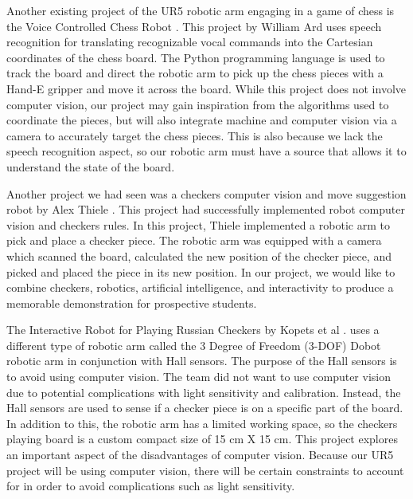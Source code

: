 Another existing project of the UR5 robotic arm engaging in a game of chess is the Voice Controlled Chess Robot \cite{Ard2020}. This project by William Ard uses speech recognition for translating recognizable vocal commands into the Cartesian coordinates of the chess board. The Python programming language is used to track the board and direct the robotic arm to pick up the chess pieces with a Hand-E gripper and move it across the board. While this project does not involve computer vision, our project may gain inspiration from the algorithms used to coordinate the pieces, but will also integrate machine and computer vision via a camera to  accurately target the chess pieces. This is also because we lack the speech recognition aspect, so our robotic arm must have a source that allows it to understand the state of the board.  

Another project we had seen was a checkers computer vision and move suggestion robot by Alex Thiele \cite{Thiele2015}. This project had successfully implemented robot computer vision and checkers rules. In this project, Thiele implemented a robotic arm to pick and place a checker piece. The robotic arm was equipped with a camera which scanned the board, calculated the new position of the checker piece, and picked and placed the piece in its new position. In our project, we would like to combine checkers, robotics, artificial intelligence, and interactivity to produce a memorable demonstration for prospective students.

The Interactive Robot for Playing Russian Checkers by Kopets et al \cite{Kopets2020}. uses a different type of robotic arm called the 3 Degree of Freedom (3-DOF) Dobot robotic arm in conjunction with Hall sensors. The purpose of the Hall sensors is to avoid using computer vision. The team did not want to use computer vision due to potential complications with light sensitivity and calibration. Instead, the Hall sensors are used to sense if a checker piece is on a specific part of the board. In addition to this, the robotic arm has a limited working space, so the checkers playing board is a custom compact size of 15 cm X 15 cm. This project explores an important aspect of the disadvantages of computer vision. Because our UR5 project will be using computer vision, there will be certain constraints to account for in order to avoid complications such as light sensitivity.  

